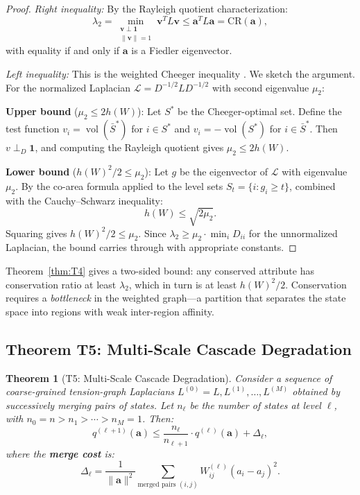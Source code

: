 \documentclass[12pt,letterpaper]{article}
\newtheorem{theorem}{Theorem}[section]
\newcommand{\One}{\mathbf{1}}
\newcommand{\bfa}{\mathbf{a}}
\newcommand{\bfv}{\mathbf{v}}
\newcommand{\CR}{\mathrm{CR}}
\newcommand{\vol}{\operatorname{vol}}
\begin{document}
\begin{proof}
\textit{Right inequality:} By the Rayleigh quotient characterization:
\[
  \lambda_2 = \min_{\substack{\bfv \perp \One \\ \|\bfv\| = 1}} \bfv^T L \bfv \leq \bfa^T L \bfa = \CR(\bfa),
\]
with equality if and only if $\bfa$ is a Fiedler eigenvector.

\textit{Left inequality:} This is the weighted Cheeger inequality \citep{cheeger1970,alon1985,chung1997}. We sketch the argument. For the normalized Laplacian $\mathcal{L} = D^{-1/2} L D^{-1/2}$ with second eigenvalue $\mu_2$:

\textbf{Upper bound} ($\mu_2 \leq 2h(W)$): Let $S^*$ be the Cheeger-optimal set. Define the test function $v_i = \vol(\bar{S}^*)$ for $i \in S^*$ and $v_i = -\vol(S^*)$ for $i \in \bar{S}^*$. Then $v \perp_D \One$, and computing the Rayleigh quotient gives $\mu_2 \leq 2h(W)$.

\textbf{Lower bound} ($h(W)^2/2 \leq \mu_2$): Let $g$ be the eigenvector of $\mathcal{L}$ with eigenvalue $\mu_2$. By the co-area formula \citep{federer1969} applied to the level sets $S_t = \{i : g_i \geq t\}$, combined with the Cauchy--Schwarz inequality:
\[
  h(W) \leq \sqrt{2\mu_2}.
\]
Squaring gives $h(W)^2/2 \leq \mu_2$. Since $\lambda_2 \geq \mu_2 \cdot \min_i D_{ii}$ for the unnormalized Laplacian, the bound carries through with appropriate constants.
\end{proof}

Theorem~\ref{thm:T4} gives a two-sided bound: any conserved attribute has conservation ratio at least $\lambda_2$, which in turn is at least $h(W)^2/2$. Conservation requires a \emph{bottleneck} in the weighted graph---a partition that separates the state space into regions with weak inter-region affinity.

\subsection{Theorem T5: Multi-Scale Cascade Degradation}
\label{sec:T5}

\begin{theorem}[T5: Multi-Scale Cascade Degradation]
\label{thm:T5}
Consider a sequence of coarse-grained tension-graph Laplacians $L^{(0)} = L, L^{(1)}, \ldots, L^{(M)}$ obtained by successively merging pairs of states. Let $n_\ell$ be the number of states at level $\ell$, with $n_0 = n > n_1 > \cdots > n_M = 1$. Then:
\begin{equation}
\label{eq:T5}
  q^{(\ell+1)}(\bfa) \leq \frac{n_\ell}{n_{\ell+1}} \cdot q^{(\ell)}(\bfa) + \Delta_\ell,
\end{equation}
where the \textbf{merge cost} is:
\[
  \Delta_\ell = \frac{1}{\|\bfa\|^2}\sum_{\text{merged pairs } (i,j)} W_{ij}^{(\ell)} (a_i - a_j)^2.
\]
\end{theorem}
\end{document}
